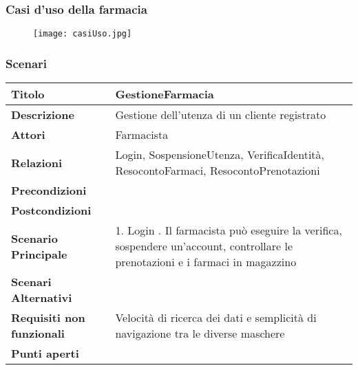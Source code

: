 \newpage %
\subsubsection{Casi d'uso della farmacia}

\begin{figure}[h!]
  \begin{center}
      \texttt{[image: casiUso.jpg]}
  \end{center}
\end{figure}

\newpage %
\subsubsection{Scenari}
\hfill \break

\begin{tabular} {|P{4.5cm}|P{12.5cm}|}
\hline  
  \textbf{Titolo} & GestioneFarmacia \\
\hline
  \textbf{Descrizione} & Gestione dell'utenza di un cliente registrato \\
\hline
  \textbf{Attori} & Farmacista\\
\hline
  \textbf{Relazioni} & Login, SospensioneUtenza, VerificaIdentità, ResocontoFarmaci, ResocontoPrenotazioni\\
\hline
  \textbf{Precondizioni} & \\
\hline
  \textbf{Postcondizioni} & \\
\hline
  \textbf{Scenario Principale} & 1. Login . Il farmacista può eseguire la verifica, sospendere un'account, controllare le prenotazioni e i farmaci in magazzino\\
\hline
  \textbf{Scenari Alternativi} &\\
\hline
  \textbf{Requisiti non funzionali} & Velocità di ricerca dei dati e semplicità di navigazione tra le diverse maschere\\
\hline
  \textbf{Punti aperti} &\\
\hline
\end{tabular}
\hfill
\break

